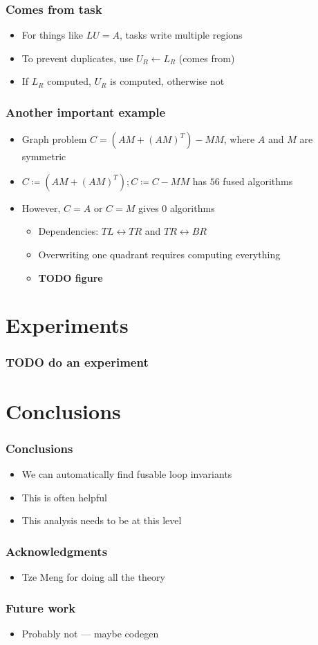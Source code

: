 \documentclass{beamer}
\begin{document}
\begin{frame}
  \frametitle{Comes from task}
  \begin{itemize}
  \item For things like $LU = A$, tasks write multiple regions
  \item To prevent duplicates, use $U_R \leftarrow L_R$ (comes from)
  \item If $L_R$ computed, $U_R$ is computed, otherwise not
  \end{itemize}
\end{frame}

\begin{frame}
  \frametitle{Another important example}
  \begin{itemize}
  \item Graph problem $C = (AM + (AM)^T) - MM$, where $A$ and $M$ are symmetric
  \item $C \coloneqq (AM + (AM)^T); C \coloneqq C - MM$ has $56$ fused algorithms
  \item However, $C = A$ or $C = M$ gives $0$ algorithms
    \begin{itemize}
    \item Dependencies: $TL \leftrightarrow TR$ and $TR \leftrightarrow BR$
    \item Overwriting one quadrant requires computing everything
    \item \textbf{TODO figure}
    \end{itemize}
  \end{itemize}
\end{frame}

\section{Experiments}

\begin{frame}
  \frametitle{TODO do an experiment}
\end{frame}

\section*{Conclusions}

\begin{frame}
  \frametitle{Conclusions}
  \begin{itemize}
  \item We can automatically find fusable loop invariants
  \item This is often helpful
  \item This analysis needs to be at this level
  \end{itemize}
\end{frame}

\begin{frame}
  \frametitle{Acknowledgments}
  \begin{itemize}
  \item Tze Meng for doing all the theory
  \end{itemize}
\end{frame}

\begin{frame}
  \frametitle{Future work}
  \begin{itemize}
  \item Probably not --- maybe codegen
  \end{itemize}
\end{frame}
\end{document}
